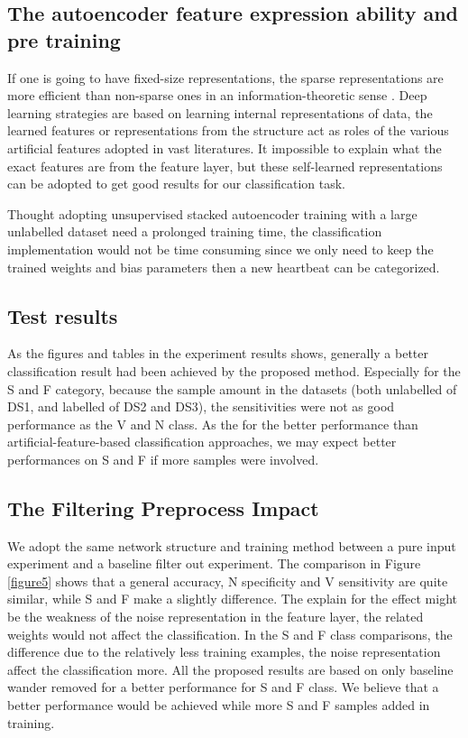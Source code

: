 \documentclass[journal]{IEEEtran}
\begin{document}
\subsection{The autoencoder feature expression ability and pre training}
If one is going to have fixed-size representations, the sparse representations are more efficient than non-sparse ones in an information-theoretic sense \cite{hinton}. 
Deep learning strategies are based on learning internal representations of data, the learned features or representations from the structure act as roles of the various artificial features adopted in vast literatures. It impossible to explain what the exact features are from the feature layer, but these self-learned representations can be adopted to get good results for our classification task.

Thought adopting unsupervised stacked autoencoder training with a large unlabelled dataset need a prolonged training time, the classification implementation would not be time consuming since we only need to keep the trained weights and bias parameters then a new heartbeat can be categorized. 

\subsection{Test results}
As the figures and tables in the experiment results shows, generally a better classification result had been achieved by the proposed method. Especially for the S and F category, because the sample amount in the datasets (both unlabelled of DS1, and labelled of DS2 and DS3), the sensitivities were not as good performance as the V and N class. 
As the for the better performance than artificial-feature-based classification approaches, we may expect better performances on S and F if more samples were involved.

\subsection{The Filtering Preprocess Impact}
We adopt the same network structure and training method between a pure input experiment and a baseline filter out experiment. The comparison in Figure \ref{figure5} shows that a general accuracy, N specificity and V sensitivity are quite similar, while S and F make a slightly difference. The explain for the effect might be the weakness of the noise representation in the feature layer, the related weights would not affect the classification. In the S and F class comparisons, the difference due to the relatively less training examples, the noise representation affect the classification more.
All the proposed results are based on only baseline wander removed for a better performance for S and F class.
We believe that a better performance would be achieved while more S and F samples added in training.
\end{document}
